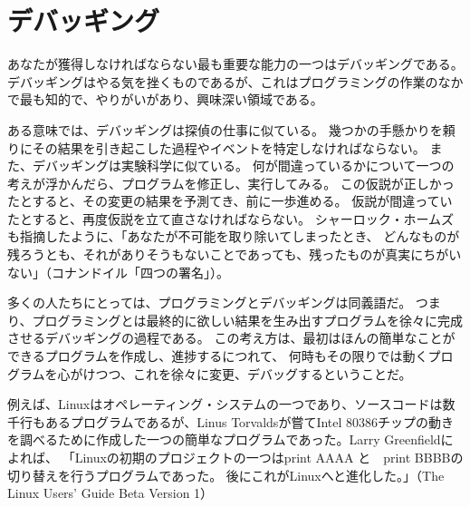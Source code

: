 \documentclass[a4j,12pt,makeidx]{jbook}
\begin{document}
\section{デバッギング}
あなたが獲得しなければならない最も重要な能力の一つはデバッギングである。
デバッギングはやる気を挫くものであるが、これはプログラミングの作業のなかで最も知的で、やりがいがあり、興味深い領域である。\par
ある意味では、デバッギングは探偵の仕事に似ている。
幾つかの手懸かりを頼りにその結果を引き起こした過程やイベントを特定しなければならない。
また、デバッギングは実験科学に似ている。
何が間違っているかについて一つの考えが浮かんだら、プログラムを修正し、実行してみる。
この仮説が正しかったとすると、その変更の結果を予測てき、前に一歩進める。
仮説が間違っていたとすると、再度仮説を立て直さなければならない。
シャーロック・ホームズも指摘したように、「あなたが不可能を取り除いてしまったとき、
どんなものが残ろうとも、それがありそうもないことであっても、残ったものが真実にちがいない」（コナンドイル「四つの署名」）。\par
多くの人たちにとっては、プログラミングとデバッギングは同義語だ。
つまり、プログラミングとは最終的に欲しい結果を生み出すプログラムを徐々に完成させるデバッギングの過程である。
この考え方は、最初はほんの簡単なことができるプログラムを作成し、進捗するにつれて、
何時もその限りでは動くプログラムを心がけつつ、これを徐々に変更、デバッグするということだ。\par
例えば、Linuxはオペレーティング・システムの一つであり、ソースコードは数千行もあるプログラムであるが、Linus Torvaldsが嘗てIntel 80386チップの動きを調べるために作成した一つの簡単なプログラムであった。Larry Greenfieldによれば、
「Linuxの初期のプロジェクトの一つはprint AAAA と　print BBBBの切り替えを行うプログラムであった。
後にこれがLinuxへと進化した。」（The Linux Users’ Guide Beta Version 1）
%
\end{document}
